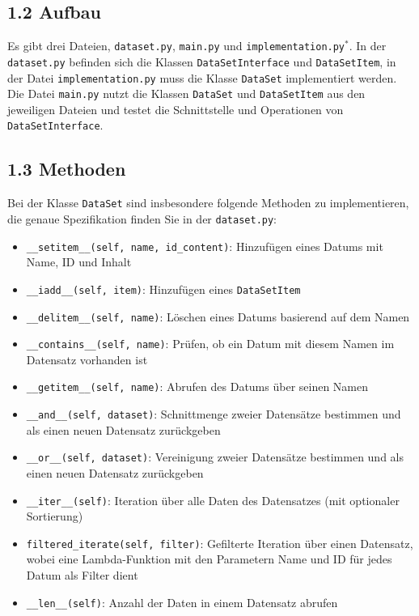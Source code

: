 \documentclass[]{article}
\begin{document}
\subsection{1.2 Aufbau}
Es gibt drei Dateien, \texttt{dataset.py}, \texttt{main.py} und \texttt{implementation.py}$^{*}$. In der \texttt{dataset.py} befinden sich die Klassen \texttt{DataSetInterface} und \texttt{DataSetItem}, in der Datei \texttt{implementation.py} muss die Klasse \texttt{DataSet} implementiert werden. Die Datei \texttt{main.py} nutzt die Klassen \texttt{DataSet} und \texttt{DataSetItem} aus den jeweiligen Dateien und testet die Schnittstelle und Operationen von \texttt{DataSetInterface}.\\

\subsection{1.3 Methoden}
Bei der Klasse \texttt{DataSet} sind insbesondere folgende Methoden zu implementieren, die genaue Spezifikation finden Sie in der \texttt{dataset.py}:
\begin{itemize}
    \item \texttt{\_\_setitem\_\_(self, name, id\_content)}: Hinzufügen eines Datums mit Name, ID und Inhalt
    \item \texttt{\_\_iadd\_\_(self, item)}: Hinzufügen eines \texttt{DataSetItem}
    \item \texttt{\_\_delitem\_\_(self, name)}: Löschen eines Datums basierend auf dem Namen
    \item \texttt{\_\_contains\_\_(self, name)}: Prüfen, ob ein Datum mit diesem Namen im Datensatz vorhanden ist
    \item \texttt{\_\_getitem\_\_(self, name)}: Abrufen des Datums über seinen Namen
    \item \texttt{\_\_and\_\_(self, dataset)}: Schnittmenge zweier Datensätze bestimmen und als einen neuen Datensatz zurückgeben
    \item \texttt{\_\_or\_\_(self, dataset)}: Vereinigung zweier Datensätze bestimmen und als einen neuen Datensatz zurückgeben
    \item \texttt{\_\_iter\_\_(self)}: Iteration über alle Daten des Datensatzes (mit optionaler Sortierung)
    \item \texttt{filtered\_iterate(self, filter)}: Gefilterte Iteration über einen Datensatz, wobei eine Lambda-Funktion mit den Parametern Name und ID für jedes Datum als Filter dient
    \item \texttt{\_\_len\_\_(self)}: Anzahl der Daten in einem Datensatz abrufen
\end{itemize}
\end{document}
